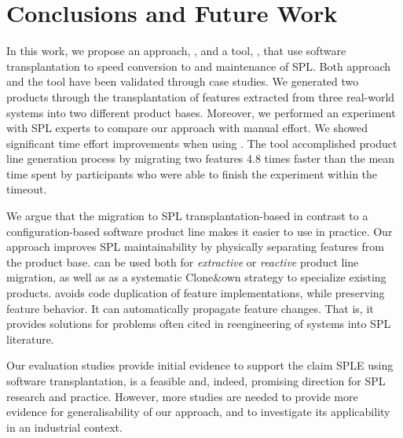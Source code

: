 \section{Conclusions and Future Work} \label{sec:conclusion} 

In this work, we propose an approach, \FOUNDRY, and a tool, \prodscalpel, that use software transplantation to speed conversion to and maintenance of SPL.
Both approach and the tool have been validated through case studies. 
We generated two products through the transplantation of features extracted from three real-world systems into two different product bases. 
Moreover, we performed an experiment with SPL experts to compare our approach with manual effort.
We showed significant time effort improvements when using \prodscalpel. 
The tool accomplished product line generation process by migrating two features 4.8 times faster than the mean time spent by participants who were able to finish the experiment within the timeout.

We argue that the migration to SPL transplantation-based in contrast to a configuration-based software product line makes it easier to use in practice.
Our approach improves SPL maintainability by physically separating features from the product base.  
\FOUNDRY can be used both for \emph{extractive} or \emph{reactive} product line migration, as well as as a systematic Clone\&own strategy to specialize existing products.
\FOUNDRY avoids code duplication of feature implementations, while preserving feature behavior. 
It can automatically propagate feature changes. 
That is, it provides solutions for problems often cited in reengineering of systems into SPL literature.

Our evaluation studies provide initial evidence to support the claim SPLE 
using software transplantation, is a feasible and, indeed, promising direction for SPL research and practice.
However, more studies are needed to provide more evidence for generalisability of our approach, and to investigate its applicability in an industrial context.


